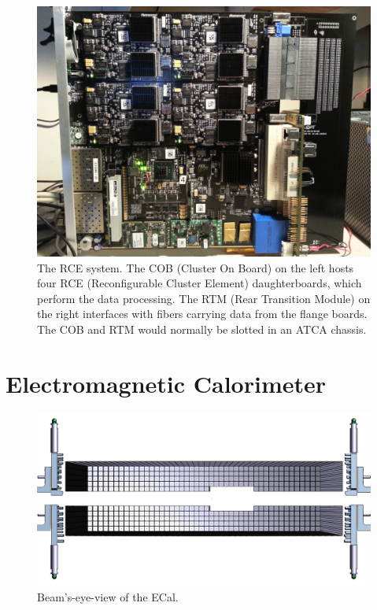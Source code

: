 \begin{figure}[ht]
    \includegraphics[width=\textwidth]{detector/figs/rce}
    \caption{The RCE system. The COB (Cluster On Board) on the left hosts four RCE (Reconfigurable Cluster Element) daughterboards, which perform the data processing. The RTM (Rear Transition Module) on the right interfaces with fibers carrying data from the flange boards. The COB and RTM would normally be slotted in an ATCA chassis.}
    \label{fig:rce}
\end{figure}


\section{Electromagnetic Calorimeter}
\begin{figure}[ht]
    \includegraphics[width=\textwidth]{detector/figs/ECal}
    \caption{Beam's-eye-view of the ECal.}
    \label{fig:ecal}
\end{figure}

